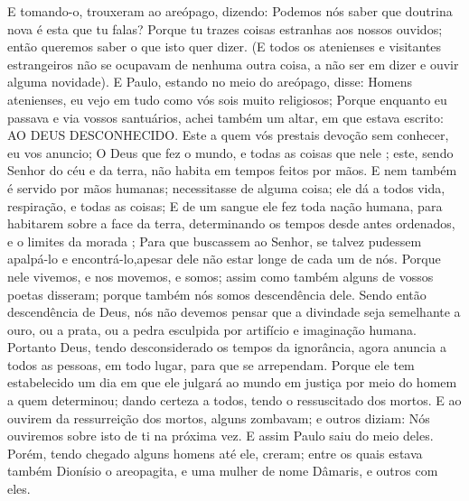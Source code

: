 {E tomando-o, trouxeram
{} ao areópago, dizendo: Podemos nós saber que doutrina nova é esta que tu falas?
Porque tu trazes coisas estranhas aos nossos ouvidos; então queremos saber o que isto quer dizer.
(E todos os atenienses e visitantes estrangeiros não se ocupavam de nenhuma outra coisa, a não ser em dizer e ouvir alguma novidade).
E Paulo, estando no meio do areópago, disse: Homens atenienses, eu vejo em tudo como vós sois muito religiosos;
Porque enquanto eu passava
{} e via vossos santuários, achei também um altar, em que estava escrito: AO DEUS DESCONHECIDO. Este a quem vós prestais devoção sem conhecer,
{} eu vos anuncio;
O Deus que fez o mundo, e todas as coisas que nele
{} ; este, sendo Senhor do céu e da terra, não habita em tempos feitos por mãos.
E nem também é servido por mãos humanas;
{} necessitasse de alguma coisa;
{} ele
{} dá a todos vida, respiração, e todas as coisas;
E de um sangue ele fez toda nação humana, para habitarem sobre a face da terra, determinando os tempos desde antes ordenados, e o limites da morada
{} ;
Para que buscassem ao Senhor, se talvez pudessem apalpá-lo e encontrá-lo,apesar dele não estar longe de cada um de nós.
Porque nele vivemos, e nos movemos, e somos; assim como também alguns de vossos poetas disseram; porque também nós somos descendência dele.
Sendo então descendência de Deus, nós não devemos pensar que a divindade seja semelhante a ouro, ou a prata, ou a pedra esculpida por artifício e imaginação humana.
Portanto Deus, tendo desconsiderado os tempos da
{} ignorância, agora anuncia a todos as pessoas, em todo lugar, para que se arrependam.
Porque ele tem estabelecido um dia em que ele julgará ao mundo em justiça por meio do homem a quem determinou; dando certeza a todos, tendo o ressuscitado dos mortos.
E ao ouvirem da ressurreição dos mortos, alguns zombavam; e outros diziam: Nós ouviremos sobre isto de ti na próxima vez.
E assim Paulo saiu do meio deles.
Porém, tendo chegado alguns homens até ele, creram; entre os quais estava também Dionísio o areopagita, e uma mulher de nome Dâmaris, e outros com eles.

}
